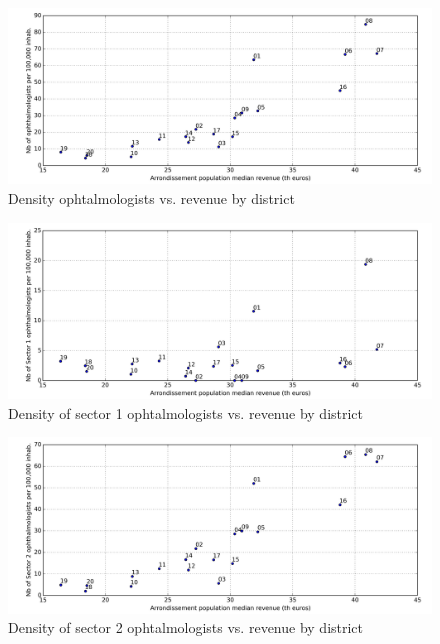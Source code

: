 \documentclass[11pt]{article}
\begin{document}
\begin{figure}[H]
    \caption{Density ophtalmologists vs. revenue by district}
		\label{fig:Ophtalmo_densities}
	\centering
		\includegraphics[width=16cm]{images/Ophtalmo_Ardt_DensityVsRevenue.png}
\end{figure}

\begin{figure}[H]
    \caption{Density of sector 1 ophtalmologists vs. revenue by district}
		\label{fig:Ophtalmo_s1_densities}
	\centering
		\includegraphics[width=16cm]{images/Ophtalmo_Ardt_DensityS1VsRevenue.png}
\end{figure}


\begin{figure}[H]
    \caption{Density of sector 2 ophtalmologists vs. revenue by district}
		\label{fig:Ophtalmo_s2_densities}
	\centering
		\includegraphics[width=16cm]{images/Ophtalmo_Ardt_DensityS2VsRevenue.png}
\end{figure}
\end{document}
